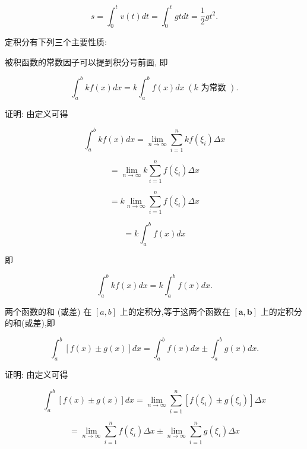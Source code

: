 \documentclass[lang=cn,newtx,12pt,scheme=chinese]{elegantbook}
\begin{document}
\[
s = {\int }_{0}^{t}v\left( t\right) {dt} = {\int }_{0}^{t}{gtdt} = \frac{1}{2}g{t}^{2}.
\]

定积分有下列三个主要性质:

\begin{proposition}[性质1]
被积函数的常数因子可以提到积分号前面, 即

\[
{\int }_{a}^{b}{kf}\left( x\right) {dx} = k{\int }_{a}^{b}f\left( x\right) {dx}\;\left( {k\text{ 为常数 }}\right) .
\]

\end{proposition}

证明: 由定义可得

\[
{\int }_{a}^{b}{kf}\left( x\right) {dx} = \mathop{\lim }\limits_{{n \rightarrow \infty }}\mathop{\sum }\limits_{{i = 1}}^{n}{kf}\left( {\xi }_{i}\right) {\Delta x}
\]

\[
= \mathop{\lim }\limits_{{n \rightarrow \infty }}k\mathop{\sum }\limits_{{i = 1}}^{n}f\left( {\xi }_{i}\right) {\Delta x}
\]

\[
= k\mathop{\lim }\limits_{{n \rightarrow \infty }}\mathop{\sum }\limits_{{i = 1}}^{n}f\left( {\xi }_{i}\right) {\Delta x}
\]

\[
= k{\int }_{a}^{b}f\left( x\right) {dx}
\]

即

\[
{\int }_{a}^{b}{kf}\left( x\right) {dx} = k{\int }_{a}^{b}f\left( x\right) {dx}.
\]

\begin{proposition}[性质2]

两个函数的和 (或差) 在 \(\left\lbrack {a,b}\right\rbrack\) 上的定积分,等于这两个函数在 \(\left\lbrack {\mathbf{a},\mathbf{b}}\right\rbrack\) 上的定积分的和(或差),即

\[
{\int }_{a}^{b}\left\lbrack {f\left( x\right) \pm g\left( x\right) }\right\rbrack {dx} = {\int }_{a}^{b}f\left( x\right) {dx} \pm {\int }_{a}^{b}g\left( x\right) {dx}.
\]

\end{proposition}

证明: 由定义可得

\[
{\int }_{a}^{b}\left\lbrack {f\left( x\right) \pm g\left( x\right) }\right\rbrack {dx} = \mathop{\lim }\limits_{{n \rightarrow \infty }}\mathop{\sum }\limits_{{i = 1}}^{n}\left\lbrack {f\left( {\xi }_{i}\right) \pm g\left( {\xi }_{i}\right) }\right\rbrack {\Delta x}
\]

\[
= \mathop{\lim }\limits_{{n \rightarrow \infty }}\mathop{\sum }\limits_{{i = 1}}^{n}f\left( {\xi }_{i}\right) {\Delta x} \pm \mathop{\lim }\limits_{{n \rightarrow \infty }}\mathop{\sum }\limits_{{i = 1}}^{n}g\left( {\xi }_{i}\right) {\Delta x}
\]
\end{document}
